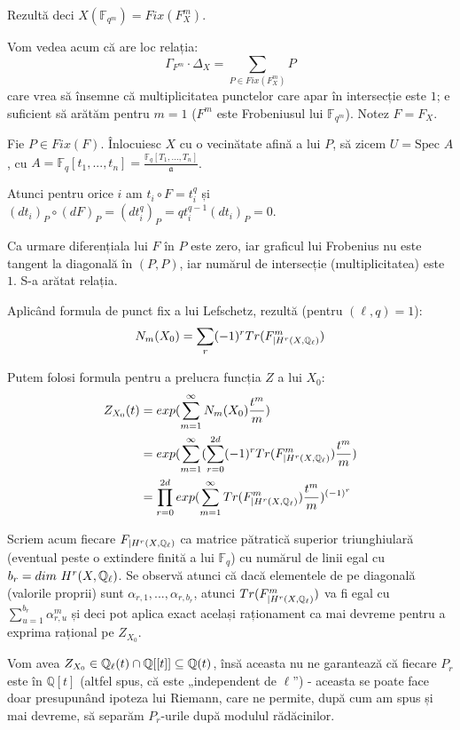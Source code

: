 \documentclass[13pt,openany,oneside]{book}
\begin{document}
Rezultă deci  $X(\mathbb{F}_{q^m})=Fix(F_X^m)$.

Vom vedea acum că are loc relația:
$$\Gamma_{F^m} \cdot \Delta_X = \sum\limits_{P \in Fix(F_X^m)} P$$
care vrea să însemne că multiplicitatea punctelor care apar în intersecție este $1$; e suficient să arătăm pentru $m=1$ ($F^m$ este Frobeniusul lui $\mathbb{F}_{q^m}$). Notez $F=F_X$.

Fie $P\in Fix(F)$. Înlocuiesc $X$ cu o vecinătate afină a lui $P$, să zicem $U=\text{Spec }A$, cu $A=\mathbb{F}_q[t_1,...,t_n]=\frac{\mathbb{F}_q[T_1,...,T_n]}{\mathfrak{a}}$.

Atunci pentru orice $i$ am $t_i \circ F = t_i^q$ și $(dt_i)_P \circ (dF)_P = (dt_i^q)_P = qt_i^{q-1}(dt_i)_P = 0$.

Ca urmare diferențiala lui $F$ în $P$ este zero, iar graficul lui Frobenius nu este tangent la diagonală în $(P,P)$, iar numărul de intersecție (multiplicitatea) este $1$. S-a arătat relația.

Aplicând formula de punct fix a lui Lefschetz, rezultă (pentru $(\ell,q)=1$):
$$N_m(X_0) = \sum\limits_r (-1)^r Tr(F^m_{\mid  H^r(X,\mathbb{Q}_\ell)})$$

Putem folosi formula pentru a prelucra funcția $Z$ a lui $X_0$:
\begin{align*}
Z_{X_0}(t)&=exp(\sum\limits_{m=1}^{\infty} N_m(X_0) \frac{t^m}{m})\\
&=exp(\sum\limits_{m=1}^{\infty} (\sum\limits_{r=0}^{2d} (-1)^r Tr(F^m_{\mid  H^r(X,\mathbb{Q}_\ell)}) \frac{t^m}{m})\\
&=\prod\limits_{r=0}^{2d}exp(\sum\limits_{m=1}^{\infty}Tr(F^m_{\mid  H^r(X,\mathbb{Q}_\ell)})  \frac{t^m}{m}) ^ { (-1)^r }
\end{align*}

Scriem acum fiecare $F_{\mid  H^r(X,\mathbb{Q}_\ell)}$ ca matrice pătratică superior triunghiulară (eventual peste o extindere finită a lui $\mathbb{F}_q$) cu numărul de linii egal cu $b_r=dim\ H^r(X,\Qell)$. Se observă atunci că dacă elementele de pe diagonală (valorile proprii) sunt $\alpha_{r,1},...,\alpha_{r,b_r}$, atunci $Tr(F^m_{\mid  H^r(X,\mathbb{Q}_\ell)})$ va fi egal cu $\sum\limits_{u=1}^{b_r} \alpha_{r,u}^m$ și deci pot aplica exact același raționament ca mai devreme pentru a exprima rațional pe $Z_{X_0}$.

Vom avea $Z_{X_0} \in \mathbb{Q}_\ell(t) \cap \mathbb{Q}[[t]] \subseteq \mathbb{Q}(t)$, însă aceasta nu ne garantează că fiecare $P_r$ este în $\mathbb{Q}[t]$ (altfel spus, că este „independent de $\ell$”) - aceasta se poate face doar presupunând ipoteza lui Riemann, care ne permite, după cum am spus și mai devreme, să separăm $P_r$-urile după modulul rădăcinilor.
\end{document}

